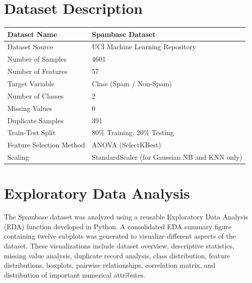 \documentclass[12pt,a4paper]{article}
\begin{document}
	\section{Dataset Description}
	
	\begin{longtable}{|p{6cm}|p{8cm}|}
		\hline
		
		Dataset Name & Spambase Dataset \\ \hline
		
		Dataset Source & UCI Machine Learning Repository \\ \hline
		
		Number of Samples & 4601 \\ \hline
		
		Number of Features & 57 \\ \hline
		
		Target Variable & Class (Spam / Non-Spam) \\ \hline
		
		Number of Classes & 2 \\ \hline
		
		Missing Values & 0 \\ \hline
		
		Duplicate Samples & 391 \\ \hline
		
		Train-Test Split & 80\% Training, 20\% Testing \\ \hline
		
		Feature Selection Method & ANOVA (SelectKBest) \\ \hline
		
		Scaling & StandardScaler (for Gaussian NB and KNN only) \\ \hline
		
	\end{longtable}
	
	\section{Exploratory Data Analysis}
	
	The Spambase dataset was analyzed using a reusable Exploratory Data Analysis (EDA) function developed in Python. A consolidated EDA summary figure containing twelve subplots was generated to visualize different aspects of the dataset. These visualizations include dataset overview, descriptive statistics, missing value analysis, duplicate record analysis, class distribution, feature distributions, boxplots, pairwise relationships, correlation matrix, and distribution of important numerical attributes.
	
\end{document}
